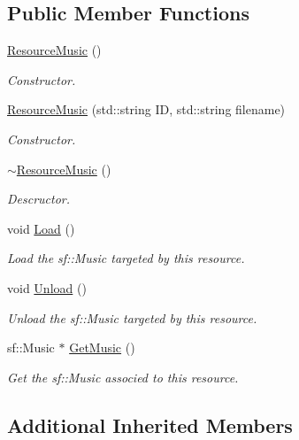 \subsection*{Public Member Functions}
\begin{DoxyCompactItemize}
\item 
\mbox{\hyperlink{classsfmlbe_1_1_resource_music_a9a20ebb5669632cbc4d85afb6ecf8848}{Resource\+Music}} ()
\begin{DoxyCompactList}\small\item\em Constructor. \end{DoxyCompactList}\item 
\mbox{\hyperlink{classsfmlbe_1_1_resource_music_a31e4aa77dd956096604e3b939e3d2075}{Resource\+Music}} (std\+::string ID, std\+::string filename)
\begin{DoxyCompactList}\small\item\em Constructor. \end{DoxyCompactList}\item 
\mbox{\hyperlink{classsfmlbe_1_1_resource_music_a13f5a79c13b15951d855cad9224a1a7b}{$\sim$\+Resource\+Music}} ()
\begin{DoxyCompactList}\small\item\em Descructor. \end{DoxyCompactList}\item 
void \mbox{\hyperlink{classsfmlbe_1_1_resource_music_a8d612eff1f1f8847c2b96a616456e558}{Load}} ()
\begin{DoxyCompactList}\small\item\em Load the sf\+::\+Music targeted by this resource. \end{DoxyCompactList}\item 
void \mbox{\hyperlink{classsfmlbe_1_1_resource_music_a5697430030c12a5850f317147feb059f}{Unload}} ()
\begin{DoxyCompactList}\small\item\em Unload the sf\+::\+Music targeted by this resource. \end{DoxyCompactList}\item 
sf\+::\+Music $\ast$ \mbox{\hyperlink{classsfmlbe_1_1_resource_music_a2092277768f71da98fac91d2d37c898c}{Get\+Music}} ()
\begin{DoxyCompactList}\small\item\em Get the sf\+::\+Music associed to this resource. \end{DoxyCompactList}\end{DoxyCompactItemize}
\subsection*{Additional Inherited Members}


